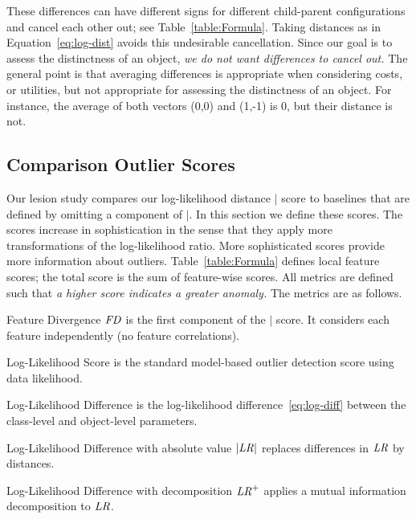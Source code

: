 \documentclass[conference]{IEEEtran}
\begin{document}
These differences can have different signs for different child-parent configurations and cancel each other out; see Table~\ref{table:Formula}. Taking distances as in Equation~\ref{eq:log-dist} avoids this undesirable cancellation. Since our goal is to assess the distinctness of an object, {\em we do not want differences to cancel out.} The general point is that averaging differences is appropriate when considering costs, or utilities, but not appropriate for assessing the distinctness of an object. For instance, the average of both vectors (0,0) and (1,-1) is 0, but their distance is not.



\subsection{Comparison Outlier Scores} Our lesion study compares our log-likelihood distance  $\mid$ score to baselines that are defined by omitting a component of $\mid$. In this section we define these scores.
  The scores increase in sophistication in the sense that they apply more transformations of the log-likelihood ratio. 
More sophisticated scores provide more information about outliers.   
Table~\ref{table:Formula} defines local feature scores; the total score is the sum of feature-wise scores. All metrics are defined such that {\em a higher score indicates a greater anomaly.} The metrics are as follows. 

\begin{LaTeXdescription}
\item[Feature Divergence $\it{FD}$] is the first  component of the $\mid$ score. It considers each feature independently (no feature correlations).
%							
\item[Log-Likelihood Score \loglikelihood] is the standard model-based outlier detection score using data likelihood.
\item[Log-Likelihood Difference \lr] is the log-likelihood difference~\eqref{eq:log-diff} between the class-level and object-level parameters. %
\item[Log-Likelihood Difference with absolute value $|\it{LR}|$] replaces differences in $\it{LR}$ by distances.
\item[Log-Likelihood Difference with decomposition $\it{LR}^{+}$] applies a mutual information decomposition to $\it{LR}$.
\end{LaTeXdescription}
\end{document}
